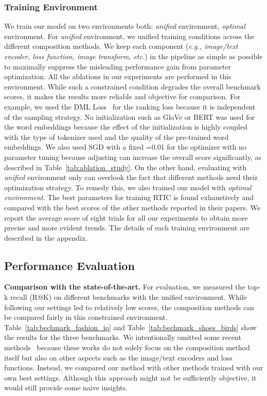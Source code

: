 \documentclass[10pt,twocolumn,letterpaper]{article}
\begin{document}
\subsubsection{Training Environment}
We train our model on two environments both: \textit{unified} environment, \textit{optimal} environment.
For \textit{unified} environment, we unified training conditions across the different composition methods. We keep each component (\textit{e.g., image/text encoder, loss function, image transform, etc.}) in the pipeline as simple as possible to maximally suppress the misleading performance gain from parameter optimization. All the ablations in our experiments are performed in this environment. While such a constrained condition degrades the overall benchmark scores, it makes the results more reliable and objective for comparison. For example, we used the DML Loss~\cite{vo2019composing} for the ranking loss because it is independent of the sampling strategy. No initialization such as GloVe or BERT was used for the word embeddings because the effect of the initialization is highly coupled with the type of tokenizer used and the quality of the pre-trained word embeddings. We also used SGD with a fixed =0.01 for the optimizer with no parameter tuning because adjusting  can increase the overall score significantly, as described in Table~\ref{tab:ablation_study}. On the other hand, evaluating with \textit{unified} environment only can overlook the fact that different methods need their optimization strategy. To remedy this, we also trained our model with \textit{optimal environment}. The best parameters for training RTIC is found exhaustively and compared with the best scores of the other methods reported in their papers. We report the average score of eight trials for all our experiments to obtain more precise and more evident trends. The details of each training environment are described in the appendix.


\subsection{Performance Evaluation}

\noindent
\textbf{Comparison with the state-of-the-art.}
For evaluation, we measured the top-k recall (R@K) on different benchmarks with the unified environment. While following our settings led to relatively low scores, the composition methods can be compared fairly in this constrained environment. Table~\ref{tab:bechmark_fashion_iq} and Table~\ref{tab:bechmark_shoes_birds} show the results for the three benchmarks. We intentionally omitted some recent methods~\cite{chen2020learning,jandial2020trace,chen2020image,yu2020curlingnet} because these works do not solely focus on the composition method itself but also on other aspects such as the image/text encoders and loss functions. Instead, we compared our method with other methods trained with our own best settings. Although this approach might not be sufficiently objective, it would still provide some naive insights.
\end{document}
